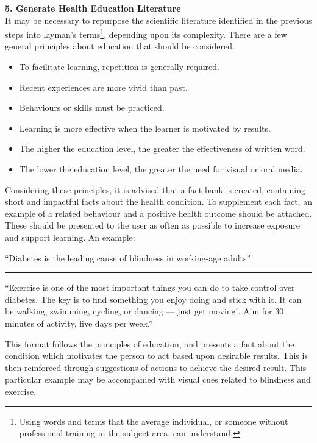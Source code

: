 \textbf{5. Generate Health Education Literature} \\
It may be necessary to repurpose the scientific literature identified in the previous steps into layman's terms\footnote{Using words and terms that the average individual, or someone without professional training in the subject area, can understand.}, depending upon its complexity.
There are a few general principles about education \cite{Gilbert2010} that should be considered:
\begin{itemize}[noitemsep,topsep=0pt]
\item To facilitate learning, repetition is generally required.
\item Recent experiences are more vivid than past.
\item Behaviours or skills must be practiced.
\item Learning is more effective when the learner is motivated by results.
\item The higher the education level, the greater the effectiveness of written word.
\item The lower the education level, the greater the need for visual or oral media.
\end{itemize}

Considering these principles, it is advised that a fact bank is created, containing short and impactful facts about the health condition. To supplement each fact, an example of a related behaviour and a positive health outcome should be attached. These should be presented to the user as often as possible to increase exposure and support learning. An example:
\begin{displayquote}
``Diabetes is the leading cause of blindness in working-age adults''
\begin{center}
	\rule{1cm}{0.4pt}
\end{center}
``Exercise is one of the most important things you can do to take control over diabetes. The key is to find something you enjoy doing and stick with it. It can be walking, swimming, cycling, or dancing — just get moving!. Aim for 30 minutes of activity, five days per week.''
\end{displayquote}

This format follows the principles of education, and presents a fact about the condition which motivates the person to act based upon desirable results. This is then reinforced through suggestions of actions to achieve the desired result. This particular example may be accompanied with visual cues related to blindness and exercise.

